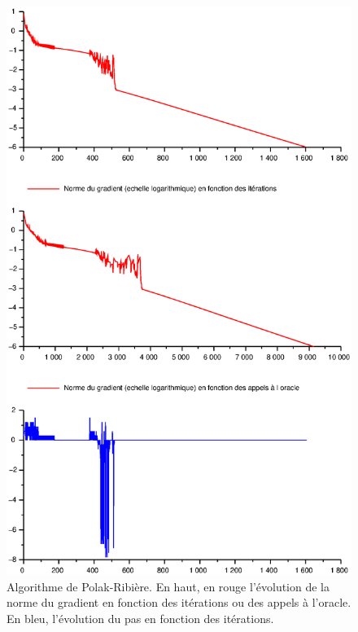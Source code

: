 \documentclass[11pt]{article}
\begin{document}
\begin{figure}[H]
  \centering
    \includegraphics[width=0.95 \textwidth]{Images/Lagrange_pol_ribi.eps}
  \caption{Algorithme de Polak-Ribière. En haut, en rouge l'évolution de la norme du gradient en fonction des itérations ou des appels à l'oracle. En bleu, l'évolution du pas en fonction des itérations.}
\end{figure}
\end{document}
